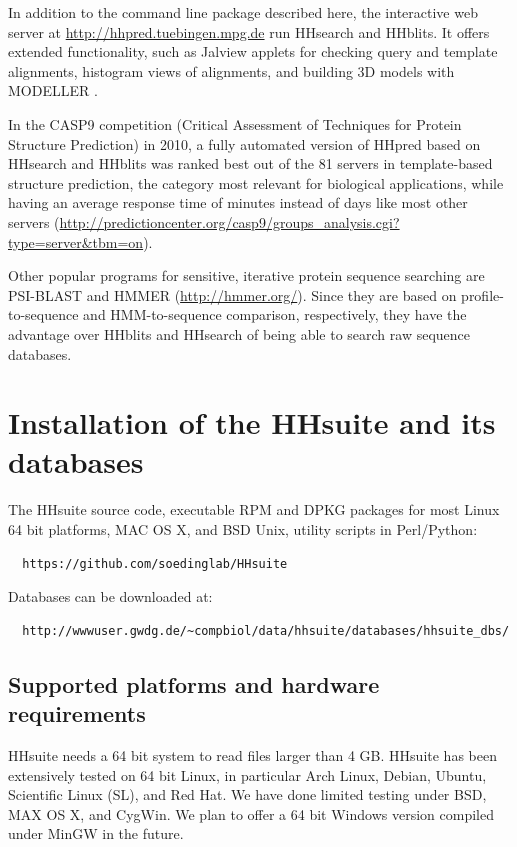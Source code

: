 \documentclass[11pt,a4paper]{article}
\begin{document}
In addition to the command line package described here, the interactive web server at \url{http://hhpred.tuebingen.mpg.de} \cite{Soding:2005b, Hildebrand:2009} run HHsearch and HHblits. It offers extended functionality, such as Jalview applets for checking query and template alignments, histogram views of alignments, and building 3D models with MODELLER \cite{Sali:1993}. 

In the CASP9 competition (Critical Assessment of Techniques for Protein Structure Prediction) in 2010, a fully automated version of HHpred based on HHsearch and HHblits was ranked best out of the 81 servers in template-based structure prediction, the category most relevant for biological applications, while having an average response time of minutes instead of days like most other servers \cite{Mariani:2011} (\url{http://predictioncenter.org/casp9/groups_analysis.cgi?type=server&tbm=on}). 

Other popular programs for sensitive, iterative protein sequence searching are PSI-BLAST \cite{Altschul:1997} and HMMER (\url{http://hmmer.org/}). Since they are based on profile-to-sequence and HMM-to-sequence comparison, respectively, they have the advantage over HHblits and HHsearch of being able to search raw sequence databases.


\section{Installation of the HHsuite and its databases}

The HHsuite source code, executable RPM and DPKG packages for most Linux 64 bit platforms, MAC OS X, and BSD Unix, utility scripts in Perl/Python:
\begin{verbatim}
  https://github.com/soedinglab/HHsuite
\end{verbatim}


Databases can be downloaded at:
\begin{verbatim}
  http://wwwuser.gwdg.de/~compbiol/data/hhsuite/databases/hhsuite_dbs/
\end{verbatim}

\subsection{Supported platforms and hardware requirements} \label{installation}

HHsuite needs a 64 bit system to read files larger than 4 GB. HHsuite has been extensively tested on 64 bit Linux, in particular Arch Linux, Debian, Ubuntu, Scientific Linux (SL), and Red Hat. We have done limited testing under BSD, MAX OS X, and CygWin. We plan to offer a 64 bit Windows version compiled under MinGW in the future.
\end{document}
